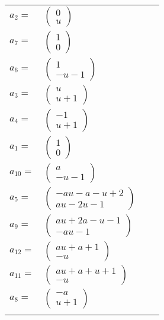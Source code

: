 \documentclass[1p]{elsarticle_modified}
\theoremstyle{definition}
\begin{document}
\begin{tabular}{m{7pt} m{180pt} m{7pt} m{180pt} }
\flushright $a_{2}=$&$\begin{pmatrix}0\\u\end{pmatrix}$ \\
\flushright $a_{7}=$&$\begin{pmatrix}1\\0\end{pmatrix}$ \\
\flushright $a_{6}=$&$\begin{pmatrix}1\\- u-1\end{pmatrix}$ \\
\flushright $a_{3}=$&$\begin{pmatrix}u\\u+1\end{pmatrix}$ \\
\flushright $a_{4}=$&$\begin{pmatrix}-1\\u+1\end{pmatrix}$ \\
\flushright $a_{1}=$&$\begin{pmatrix}1\\0\end{pmatrix}$ \\
\flushright $a_{10}=$&$\begin{pmatrix}a\\- u-1\end{pmatrix}$ \\
\flushright $a_{5}=$&$\begin{pmatrix}- a u- a- u+2\\a u-2 u-1\end{pmatrix}$ \\
\flushright $a_{9}=$&$\begin{pmatrix}a u+2 a- u-1\\- a u-1\end{pmatrix}$ \\
\flushright $a_{12}=$&$\begin{pmatrix}a u+a+1\\- u\end{pmatrix}$ \\
\flushright $a_{11}=$&$\begin{pmatrix}a u+a+u+1\\- u\end{pmatrix}$ \\
\flushright $a_{8}=$&$\begin{pmatrix}- a\\u+1\end{pmatrix}$\\&\end{tabular}
\end{document}
